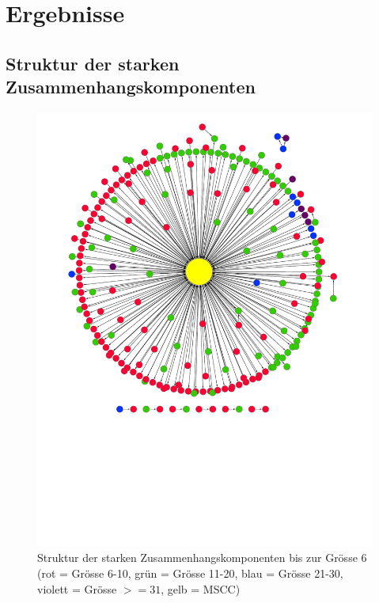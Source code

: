 
\chapter{Ergebnisse}
\label{ch:Ergebnisse}

\section{Struktur der starken Zusammenhangskomponenten}
\label{sec:struktur-der-starken}

\begin{figure}[h]
  \centering
  \includegraphics[scale=0.9]{images/metagraph-8.pdf}
  \caption{Struktur der starken Zusammenhangskomponenten bis zur
    Grösse 6 (rot = Grösse 6-10, grün = Grösse 11-20, blau = Grösse
    21-30, violett = Grösse $>= 31$, gelb = MSCC)}
  \label{fig:komponenten-struktur}
\end{figure}

